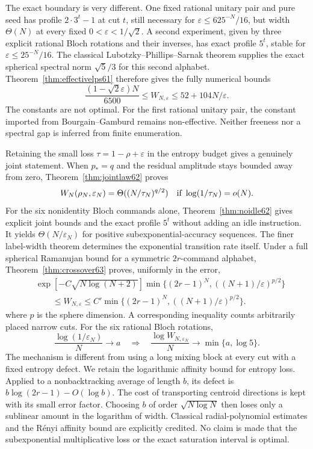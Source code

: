 The exact boundary is very different. One fixed rational unitary pair
and pure seed has profile $2\cdot3^t-1$ at cut $t$, still necessary for
$\varepsilon\le625^{-N}/16$, but width $\Theta(N)$ at every fixed
$0<\varepsilon<1/\sqrt2$. A second experiment, given by three explicit
rational Bloch rotations and their inverses, has exact profile $5^t$,
stable for $\varepsilon\le25^{-N}/16$. The classical
Lubotzky--Phillips--Sarnak theorem supplies the exact spherical spectral
norm $\sqrt5/3$ for this second alphabet. Theorem~\ref{thm:effectivelps61}
therefore gives the fully numerical bounds
\[
 \frac{(1-\sqrt2\varepsilon)N}{6500}
 \le W_{N,\varepsilon}\le52+104N/\varepsilon.
\]
The constants are not optimal. For the first rational unitary pair, the
constant imported from Bourgain--Gamburd remains non-effective. Neither
freeness nor a spectral gap is inferred from finite enumeration.

Retaining the small loss $\tau=1-\rho+\varepsilon$ in the entropy
budget gives a genuinely joint statement. When $p_*=q$ and the residual
amplitude stays bounded away from zero, Theorem~\ref{thm:jointlaw62}
proves
\[
 W_N(\rho_N,\varepsilon_N)=\Theta((N/\tau_N)^{q/2})
 \quad\hbox{if }\log(1/\tau_N)=o(N).
\]
For the six nonidentity Bloch commands alone,
Theorem~\ref{thm:noidle62} gives explicit joint bounds and the exact
profile $5^t$ without adding an idle instruction. It yields
$\Theta(N/\varepsilon_N)$ for positive subexponential-accuracy sequences.
The finer label-width theorem determines the exponential transition rate itself.
Under a full spherical Ramanujan bound for a symmetric $2r$-command
alphabet, Theorem~\ref{thm:crossover63} proves, uniformly in the error,
\[
 \begin{split}
 &\exp[-C\sqrt{N\log(N+2)}]
      \min\{(2r-1)^N,((N+1)/\varepsilon)^{p/2}\}\\
 &\hspace{2em}\le W_{N,\varepsilon}
      \le C'\min\{(2r-1)^N,((N+1)/\varepsilon)^{p/2}\}.
 \end{split}
\]
where $p$ is the sphere dimension. A corresponding inequality counts
arbitrarily placed narrow cuts. For the six rational Bloch rotations,
\[
 \frac{\log(1/\varepsilon_N)}N\longrightarrow a
 \quad\Longrightarrow\quad
 \frac{\log W_{N,\varepsilon_N}}N\longrightarrow\min\{a,\log5\}.
\]
The mechanism is different from using a long mixing block at every
cut with a fixed entropy defect. We retain the logarithmic affinity
bound for entropy loss. Applied to a nonbacktracking average of length
$b$, its defect is $b\log(2r-1)-O(\log b)$. The cost of transporting
centroid directions is kept with its small error factor. Choosing
$b$ of order $\sqrt{N\log N}$ then loses only a sublinear amount in
the logarithm of width. Classical radial-polynomial estimates and the
R\'enyi affinity bound are explicitly credited. No claim is made that
the subexponential multiplicative loss or the exact saturation interval
is optimal.

